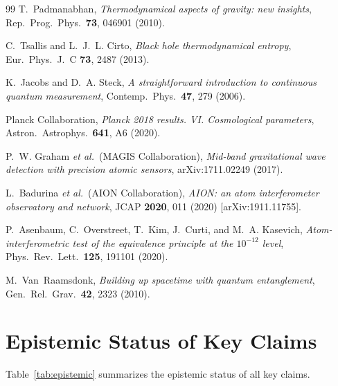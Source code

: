 \documentclass[12pt]{article}
\begin{document}
\begin{thebibliography}{99}
T.~Padmanabhan,
\textit{Thermodynamical aspects of gravity: new insights},
Rep.\ Prog.\ Phys.\ \textbf{73}, 046901 (2010).

C.~Tsallis and L.~J.~L. Cirto,
\textit{Black hole thermodynamical entropy},
Eur.\ Phys.\ J.\ C \textbf{73}, 2487 (2013).

K.~Jacobs and D.~A. Steck,
\textit{A straightforward introduction to continuous quantum measurement},
Contemp.\ Phys.\ \textbf{47}, 279 (2006).

Planck Collaboration,
\textit{Planck 2018 results. VI. Cosmological parameters},
Astron.\ Astrophys.\ \textbf{641}, A6 (2020).

P.~W. Graham \textit{et al.}\ (MAGIS Collaboration),
\textit{Mid-band gravitational wave detection with precision atomic sensors},
arXiv:1711.02249 (2017).

L.~Badurina \textit{et al.}\ (AION Collaboration),
\textit{AION: an atom interferometer observatory and network},
JCAP \textbf{2020}, 011 (2020)
[arXiv:1911.11755].

P.~Asenbaum, C.~Overstreet, T.~Kim, J.~Curti, and M.~A. Kasevich,
\textit{Atom-interferometric test of the equivalence principle at the $10^{-12}$ level},
Phys.\ Rev.\ Lett.\ \textbf{125}, 191101 (2020).

M.~Van~Raamsdonk,
\textit{Building up spacetime with quantum entanglement},
Gen.\ Rel.\ Grav.\ \textbf{42}, 2323 (2010).

\end{thebibliography}

\appendix

\section{Epistemic Status of Key Claims}
\label{app:epistemic}

Table~\ref{tab:epistemic} summarizes the epistemic status of all key claims.
\end{document}
